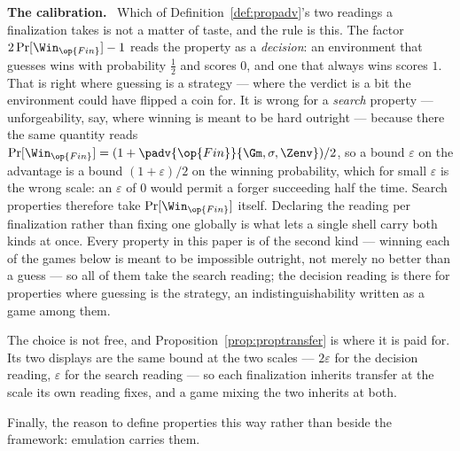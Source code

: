 \documentclass[10pt,oneside,openany]{book}
\newcommand{\heading}[1]{\medskip\par\noindent\textcolor{accent}{\textbf{#1.}}\ }
\theoremstyle{accentdef}
\theoremstyle{accentplain}
\begin{document}
\heading{The calibration} Which of Definition~\ref{def:propadv}'s two readings a finalization takes
is not a matter of taste, and the rule is this. The factor $2\Pr[\Win_{\op{Fin}}] - 1$ reads the
property as a \emph{decision}: an
environment that guesses wins with probability $\tfrac12$ and scores $0$, and one that always wins
scores $1$. That is right where guessing is a strategy --- where the verdict is a bit the
environment could have flipped a coin for. It is wrong for a \emph{search} property ---
unforgeability, say, where winning is meant to be hard outright --- because there the same quantity
reads $\Pr[\Win_{\op{Fin}}] = (1 + \padv{\op{Fin}}{\Gm,\sigma,\Zenv})/2$, so a bound
$\varepsilon$ on the advantage is a bound $(1+\varepsilon)/2$ on the winning probability, which for
small $\varepsilon$ is the wrong scale: an $\varepsilon$ of $0$ would permit a forger succeeding
half the time. Search properties therefore take $\Pr[\Win_{\op{Fin}}]$ itself. Declaring the
reading per finalization rather than fixing one globally is what lets a single shell carry both
kinds at once. Every property in this paper is of the second kind --- winning each of the games
below is meant to be impossible outright, not merely no better than a guess --- so all of them take
the search reading; the decision reading is there for properties where guessing is the strategy, an
indistinguishability written as a game among them.

The choice is not free, and Proposition~\ref{prop:proptransfer} is where it is paid for. Its two
displays are the same bound at the two scales --- $2\varepsilon$ for the decision reading,
$\varepsilon$ for the search reading --- so each finalization inherits transfer at the scale its own
reading fixes, and a game mixing the two inherits at both.

Finally, the reason to define properties this way rather than beside the framework: emulation carries
them.
\end{document}

